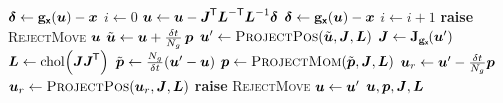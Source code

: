 \begin{multicols}{2}
\begin{algorithmic}[1]
         \State $\boldsymbol{\delta} \gets {\mathbf{g}}_{\boldsymbol{\mathsf{x}}}(\boldsymbol{u}) - \boldsymbol{x}$
         \State $i \gets 0$
         \label{ln:convergence-check}
             \State $\boldsymbol{u} \gets \boldsymbol{u} - \boldsymbol{J}^{\mkern-1.5mu\mathsf{T}} \boldsymbol{L}^{-\textsf{T}} \boldsymbol{L}^{-1} \boldsymbol{\delta}$
             \State $\boldsymbol{\delta} \gets {\mathbf{g}}_{\boldsymbol{\mathsf{x}}}(\boldsymbol{u}) - \boldsymbol{x}$
             \State $i \gets i + 1$
         \EndWhile
           \State \textbf{raise}  \textsc{RejectMove} \label{ln:non-convergence} 
         \EndIf
         \State \Return $\boldsymbol{u}$
    \EndFunction
    \State %
    \vspace{-2mm}
            \State $\tilde{\boldsymbol{u}} \gets \boldsymbol{u} + \frac{\delta t}{N_g} \,\boldsymbol{p}$
            \State $\vct{u}' \gets \Call{ProjectPos}{\tilde{\vct{u}}, \mtx{J}, \mtx{L}}$
            \State $\mtx{J} \gets \jacob{\genfunc_{\rvct{x}}}{\vct{u}'}$
            \State $\mtx{L} \gets \chol \lpa \mtx{J}\mtx{J}\tr \rpa$ \label{ln:chmc-cholesky}
            \State $\tilde{\vct{p}} \gets \frac{N_g}{\delta t}\lpa \vct{u}' - \vct{u} \rpa$
            \State $\vct{p} \gets \Call{ProjectMom}{\tilde{\vct{p}},\mtx{J},\mtx{L}}$
            \State $\boldsymbol{u}_r \gets \boldsymbol{u}' - \frac{\delta t}{N_g} \boldsymbol{p}$
            \State $\vct{u}_r \gets \Call{ProjectPos}{\vct{u}_r, \mtx{J}, \mtx{L}}$
              \State \textbf{raise} \textsc{RejectMove}\label{ln:reverse-check}
            \EndIf
            \State $\boldsymbol{u} \gets \boldsymbol{u}'$
        \EndFor        
        \State \Return $\boldsymbol{u},\boldsymbol{p},\boldsymbol{J},\boldsymbol{L}$
    \EndFunction
\end{algorithmic}
\end{multicols}
\vspace{-2mm}